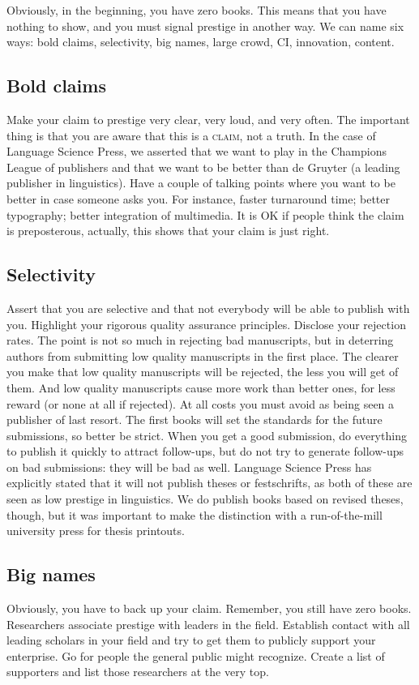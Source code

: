 \documentclass[nonflat,modfonts,output=book] {langsci/langscibook}
\begin{document}
Obviously, in the beginning, you have zero books. This means that you have nothing to show, and you must signal prestige in another way. We can name six ways:  
bold claims, 
selectivity, 
big names, 
large crowd, 
CI, 
innovation,
content. 

\subsection{Bold claims}
Make your claim to prestige very clear, very loud, and very often. The important thing is that you are aware that this is a \textsc{claim}, not a truth. In the case of Language Science Press, we asserted that we want to play in the Champions League of publishers and that we want to be better than de Gruyter (a leading publisher in linguistics). Have a couple of talking points where you want to be better in case someone asks you. For instance, faster turnaround time; better typography; better integration of multimedia. It is OK if people think the claim is preposterous, actually, this shows that your claim is just right. 

\subsection{Selectivity}
Assert that you are selective and that not everybody will be able to publish with you. Highlight your rigorous quality assurance principles. Disclose your rejection rates. The point is not so much in rejecting bad manuscripts, but in deterring authors from submitting low quality manuscripts in the first place. The clearer you make that low quality manuscripts will be rejected, the less you will get of them. And low quality manuscripts cause more work than better ones, for less reward (or none at all if rejected). 
At all costs you must avoid as being seen a publisher of last resort. The first books will set the standards for the future submissions, so better be strict. When you get a good submission, do everything to publish it quickly to attract follow-ups, but do not try to generate follow-ups on bad submissions: they will be bad as well. 
Language Science Press has explicitly stated that it will not publish theses or festschrifts, as both of these are seen as low prestige in linguistics. We do publish books based on revised theses, though, but it was important to make the distinction with a run-of-the-mill university press for thesis printouts.


\subsection{Big names}
Obviously, you have to back up your claim. Remember, you still have zero books. Researchers associate prestige with leaders in the field. Establish contact with all leading scholars in your field and try to get them to publicly support your enterprise. Go for people the general public might recognize. Create a list of supporters and list those researchers at the very top.  
\end{document}
